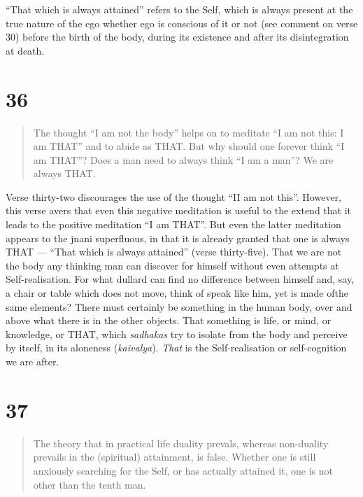 \documentclass[12pt]{report}
\begin{document}
``That which is always attained'' refers to the Self, which is always
present at the true nature of the ego whether ego is conscious of it
or not (see comment on verse 30) before the birth of the body, during
its existence and after its disintegration at death.

\section{36}

\begin{quote}
  The thought ``I am not the body'' helps on to meditate ``I am not
  this: I am THAT'' and to abide as THAT. But why should one forever
  think ``I am THAT''? Does a man need to always think ``I am a man''?
  We are always THAT.
\end{quote}

\index{}

Verse thirty-two discourages the use of the thought ``II am not
this''. However, this verse avers that even this negative meditation
is useful to the extend that it leads to the positive meditation ``I
am THAT''. But even the latter meditation appears to the jnani
superfluous, in that it is already granted that one is always THAT ---
``That which is always attained'' (verse thirty-five). That we are not
the body any thinking man can discover for himself without even
attempts at Self-realisation. For what dullard can find no difference
between himself and, say, a chair or table which does not move, think
of speak like him, yet is made ofthe same elements? There must
certainly be something in the human body, over and above what there is
in the other objects. That something is life, or mind, or knowledge,
or THAT, which \emph{sadhakas} try to isolate from the body and
perceive by itself, in its aloneness (\emph{kaivalya}). \emph{That} is
the Self-realisation or self-cognition we are after.

\section{37}

\begin{quote}
  The theory that in practical life duality prevals, whereas
  non-duality prevails in the (spiritual) attainment, is
  false. Whether one is still anxiously searching for the Self, or has
  actually attained it, one is not other than the tenth man.
\end{quote}

\end{document}
